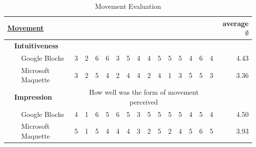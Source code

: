 \documentclass{report}
\begin{document}
		\begin{table}[H]
			\begin{center}		
			\begin{tabular}{@{}|lll|llllllllllllll|r|@{}}
				\hline
				\multicolumn{3}{|l|}{\textbf{\underline{Movement}}} & & & & & & & & & & & & & & & \textbf{average $\emptyset$} \\ \hline
				& \multicolumn{2}{l|}{\textbf{Intuitiveness}} & & & & & & & & & & & & & & &\\ \hline
				& & Google Blocks & 3 & 2 & 6 & 6 & 3 & 5 & 4 & 4 & 5 & 5 & 5 & 4 & 6 & 4 & 4.43 \\
				& & Microsoft Maquette & 3 & 2 & 5 & 4 & 2 & 4 & 4 & 2 & 4 & 1 & 3 & 5 & 5 & 3 & 3.36 \\ \hline
				
				& \multicolumn{2}{l|}{\textbf{Impression}} & \multicolumn{14}{c|}{\small{How well was the form of movement perceived}} &\\ \hline
				& & Google Blocks & 4 & 1 & 6 & 5 & 6 & 5 & 3 & 5 & 5 & 5 & 5 & 4 & 5 & 4 & 4.50 \\
				& & Microsoft Maquette & 5 & 1 & 5 & 4 & 4 & 4 & 3 & 2 & 5 & 2 & 4 & 5 & 6 & 5 & 3.93 \\ \hline
			\end{tabular}	
			\caption{Movement Evaluation}
			\label{tab:MovementEvaluation}
			\end{center}	
		\end{table}
		
\end{document}
